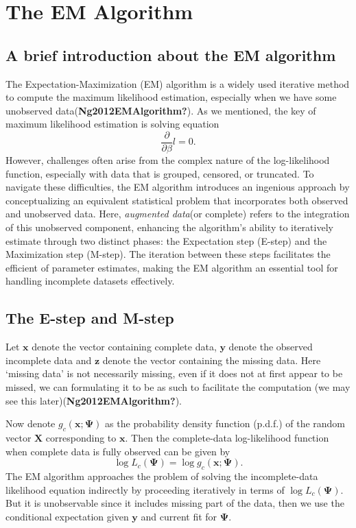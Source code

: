 \documentclass[
  12pt,
  letterpaper,
  DIV=11,
  numbers=noendperiod]{scrartcl}
\author{}
\date{2024-04-17}
\begin{document}
\section{The EM Algorithm}\label{sec-EM}

\subsection{A brief introduction about the EM
algorithm}\label{a-brief-introduction-about-the-em-algorithm}

The Expectation-Maximization (EM) algorithm is a widely used iterative
method to compute the maximum likelihood estimation, especially when we
have some unobserved data(\textbf{Ng2012EMAlgorithm?}). As we mentioned,
the key of maximum likelihood estimation is solving equation
\begin{equation}
\frac{\partial}{\partial \beta}l=0.
\end{equation} However, challenges often arise from the complex nature
of the log-likelihood function, especially with data that is grouped,
censored, or truncated. To navigate these difficulties, the EM algorithm
introduces an ingenious approach by conceptualizing an equivalent
statistical problem that incorporates both observed and unobserved data.
Here, \emph{augmented data}(or complete) refers to the integration of
this unobserved component, enhancing the algorithm's ability to
iteratively estimate through two distinct phases: the Expectation step
(E-step) and the Maximization step (M-step). The iteration between these
steps facilitates the efficient of parameter estimates, making the EM
algorithm an essential tool for handling incomplete datasets
effectively.

\subsection{The E-step and M-step}\label{the-e-step-and-m-step}

Let \(\boldsymbol{x}\) denote the vector containing complete data,
\(\boldsymbol{y}\) denote the observed incomplete data and
\(\boldsymbol{z}\) denote the vector containing the missing data. Here
`missing data' is not necessarily missing, even if it does not at first
appear to be missed, we can formulating it to be as such to facilitate
the computation (we may see this later)(\textbf{Ng2012EMAlgorithm?}).

Now denote \(g_c(\boldsymbol{x};\boldsymbol{\Psi})\) as the probability
density function (p.d.f.) of the random vector \(\boldsymbol{X}\)
corresponding to \(\boldsymbol{x}\). Then the complete-data
log-likelihood function when complete data is fully observed can be
given by
\[\log L_c(\boldsymbol{\Psi})=\log g_c(\boldsymbol{x};\boldsymbol{\Psi}).\]
The EM algorithm approaches the problem of solving the incomplete-data
likelihood equation indirectly by proceeding iteratively in terms of
\(\log L_c(\boldsymbol{\Psi})\). But it is unobservable since it
includes missing part of the data, then we use the conditional
expectation given \(\boldsymbol{y}\) and current fit for
\(\boldsymbol{\Psi}\).
\end{document}

